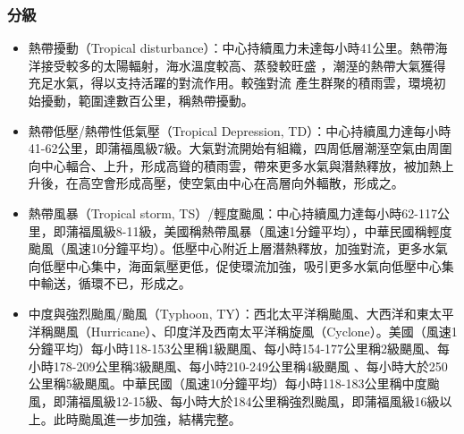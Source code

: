 \documentclass[a4paper,12pt]{report}
\begin{document}
\begin{itemize}
\subsubsection{分級}
\begin{itemize}
  \item 熱帶擾動（Tropical disturbance）：中心持續風力未達每小時41公里。熱帶海洋接受較多的太陽輻射，海水溫度較高、蒸發較旺盛 ，潮溼的熱帶大氣獲得充足水氣，得以支持活躍的對流作用。較強對流 產生群聚的積雨雲，環境初始擾動，範圍達數百公里，稱熱帶擾動。
  \item 熱帶低壓/熱帶性低氣壓（Tropical Depression, TD）：中心持續風力達每小時41-62公里，即蒲福風級7級。大氣對流開始有組織，四周低層潮溼空氣由周圍向中心輻合、上升，形成高聳的積雨雲，帶來更多水氣與潛熱釋放，被加熱上升後，在高空會形成高壓，使空氣由中心在高層向外輻散，形成之。
  \item 熱帶風暴（Tropical storm, TS）/輕度颱風：中心持續風力達每小時62-117公里，即蒲福風級8-11級，美國稱熱帶風暴（風速1分鐘平均），中華民國稱輕度颱風（風速10分鐘平均）。低壓中心附近上層潛熱釋放，加強對流，更多水氣向低壓中心集中，海面氣壓更低，促使環流加強，吸引更多水氣向低壓中心集中輸送，循環不已，形成之。
  \item 中度與強烈颱風/颱風（Typhoon, TY）：西北太平洋稱颱風、大西洋和東太平洋稱颶風（Hurricane）、印度洋及西南太平洋稱旋風（Cyclone）。美國（風速1分鐘平均）每小時118-153公里稱1級颶風、每小時154-177公里稱2級颶風、每小時178-209公里稱3級颶風、每小時210-249公里稱4級颶風 、每小時大於250公里稱5級颶風。中華民國（風速10分鐘平均）每小時118-183公里稱中度颱風，即蒲福風級12-15級、每小時大於184公里稱強烈颱風，即蒲福風級16級以上。此時颱風進一步加強，結構完整。
\end{itemize}

\end{itemize}
\end{document}
